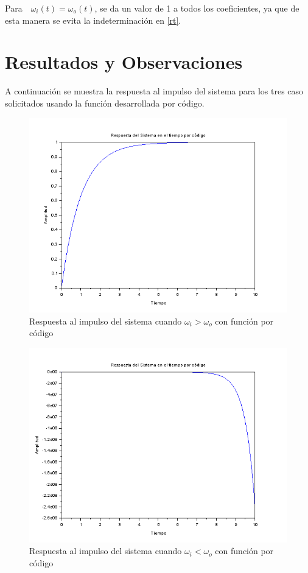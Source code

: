 \documentclass{article}
\begin{document}
	  Para$\quad \omega_i(t)=\omega_o(t)$, se da un valor de 1 a todos los coeficientes, ya que de esta manera se evita la indeterminación en \eqref{rt}.
	  
	  \section{Resultados y Observaciones}
	  
	  A continuación se muestra la respuesta al impulso del sistema para los tres caso solicitados usando la función desarrollada por código.
	  
	  \begin{figure}[H]
	  	\centering
	  		  	\includegraphics[scale=0.55]{mayor.PNG}
	  	\centering
	  	\caption{Respuesta al impulso del sistema cuando $ \omega_i > \omega_o $ con función por código}
	  \end{figure}
	  
	  
	    \begin{figure}[H]
	  	\centering
	  	\includegraphics[scale=0.55]{menor.PNG}
	  	\centering
	  	\caption{Respuesta al impulso del sistema cuando $ \omega_i < \omega_o $ con función por código}
	  \end{figure}
	  
\end{document}
